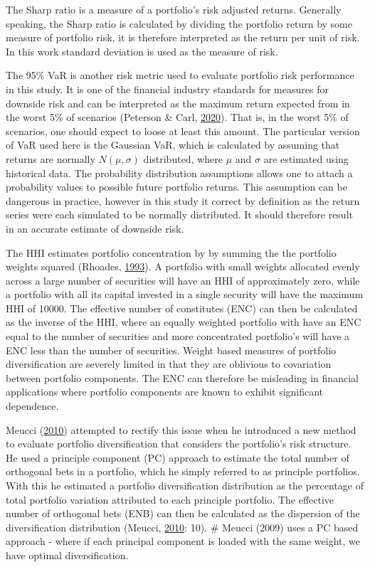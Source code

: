 \documentclass[11pt,preprint, authoryear]{elsarticle}
\numberwithin{equation}{section}
\numberwithin{figure}{section}
\numberwithin{table}{section}
\begin{document}
The Sharp ratio is a measure of a portfolio's risk adjusted returns.
Generally speaking, the Sharp ratio is calculated by dividing the
portfolio return by some measure of portfolio risk, it is therefore
interpreted as the return per unit of risk. In this work standard
deviation is used as the measure of risk.

The 95\% VaR is another risk metric used to evaluate portfolio risk
performance in this study. It is one of the financial industry standards
for measures for downside risk and can be interpreted as the maximum
return expected from in the worst 5\% of scenarios (Peterson \& Carl,
\protect\hyperlink{ref-PerformanceAnalytics}{2020}). That is, in the
worst 5\% of scenarios, one should expect to loose at least this amount.
The particular version of VaR used here is the Gaussian VaR, which is
calculated by assuming that returns are normally \(N(\mu,\sigma)\)
distributed, where \(\mu\) and \(\sigma\) are estimated using historical
data. The probability distribution assumptions allows one to attach a
probability values to possible future portfolio returns. This assumption
can be dangerous in practice, however in this study it correct by
definition as the return series were each simulated to be normally
distributed. It should therefore result in an accurate estimate of
downside risk.

The HHI estimates portfolio concentration by by summing the the
portfolio weights squared (Rhoades,
\protect\hyperlink{ref-rhoades1993}{1993}). A portfolio with small
weights allocated evenly across a large number of securities will have
an HHI of approximately zero, while a portfolio with all its capital
invested in a single security will have the maximum HHI of 10000. The
effective number of constitutes (ENC) can then be calculated as the
inverse of the HHI, where an equally weighted portfolio with have an ENC
equal to the number of securities and more concentrated portfolio's will
have a ENC less than the number of securities. Weight based measures of
portfolio diversification are severely limited in that they are
oblivious to covariation between portfolio components. The ENC can
therefore be misleading in financial applications where portfolio
components are known to exhibit significant dependence.

Meucci (\protect\hyperlink{ref-meucci2010}{2010}) attempted to rectify
this issue when he introduced a new method to evaluate portfolio
diversification that considers the portfolio's risk structure. He used a
principle component (PC) approach to estimate the total number of
orthogonal bets in a portfolio, which he simply referred to as principle
portfolios. With this he estimated a portfolio diversification
distribution as the percentage of total portfolio variation attributed
to each principle portfolio. The effective number of orthogonal bets
(ENB) can then be calculated as the dispersion of the diversification
distribution (Meucci, \protect\hyperlink{ref-meucci2010}{2010}: 10). \#
Meucci (2009) uses a PC based approach - where if each principal
component is loaded with the same weight, we have optimal
diversification.
\end{document}
